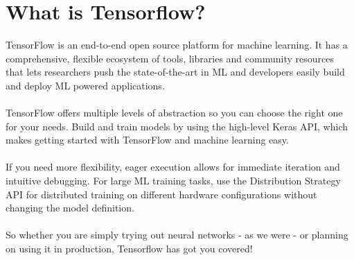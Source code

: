 \documentclass[fleqn,10pt]{SelfArx} %
\begin{document}
\flushbottom %

\maketitle

\tableofcontents %

\thispagestyle{empty} %








\section{What is Tensorflow?}
TensorFlow is an end-to-end open source platform for machine learning. It has a comprehensive, flexible ecosystem of tools, libraries and community resources that lets researchers push the state-of-the-art in ML and developers easily build and deploy ML powered applications.\\ \\
TensorFlow offers multiple levels of abstraction so you can choose the right one for your needs. Build and train models by using the high-level Keras API, which makes getting started with TensorFlow and machine learning easy.\\ \\
If you need more flexibility, eager execution allows for immediate iteration and intuitive debugging. For large ML training tasks, use the Distribution Strategy API for distributed training on different hardware configurations without changing the model definition. \cite{Tensorflow} \\ \\
So whether you are simply trying out neural networks - as we were - or planning on using it in production, Tensorflow has got you covered!
\end{document}
